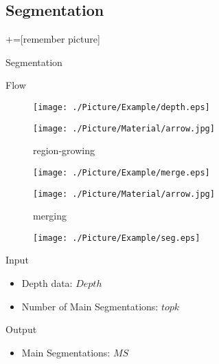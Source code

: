 \documentclass[xcolor=table,compress,blue]{beamer}
\begin{document}
\subsection{Segmentation}
\label{ALG-SEG}
+=[remember picture] %
\begin{frame}{Segmentation}
	\begin{exampleblock}{Flow}
		\begin{figure}[htpb]
			\centering
			\begin{minipage}[b]{0.8in}
				\centerline{ \texttt{[image: ./Picture/Example/depth.eps]} }
			\end{minipage}
			\begin{minipage}[b]{0.8in}
				\centerline{ \texttt{[image: ./Picture/Material/arrow.jpg]} }
				\centerline{\tiny{region-growing}}
			\end{minipage}
			\begin{minipage}[b]{0.8in}
				\centerline{ \texttt{[image: ./Picture/Example/merge.eps]} }
			\end{minipage}
			\begin{minipage}[b]{0.8in}
				\centerline{ \texttt{[image: ./Picture/Material/arrow.jpg]} }
				\centerline{\tiny{merging}}
			\end{minipage}
			\begin{minipage}[b]{0.8in}
				\centerline{ \texttt{[image: ./Picture/Example/seg.eps]} }
			\end{minipage}
		\end{figure}
	\end{exampleblock}
	\begin{exampleblock}{Input}
		\begin{itemize}		
			\item  Depth data: $Depth$
			\item  Number of Main Segmentations: ${topk}$
		\end{itemize}
	\end{exampleblock}
	\begin{exampleblock}{Output}
		\begin{itemize}		
			\item  Main Segmentations: ${MS}$
		\end{itemize}
	\end{exampleblock}
\end{frame}
\end{document}
